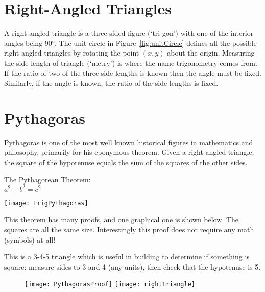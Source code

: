 \section{Right-Angled Triangles}
A right angled triangle is a three-sided figure (`tri-gon') with one of the interior angles being \ang{90}. The unit circle in Figure~\ref{fig:unitCircle} defines all the possible right angled triangles by rotating the point $(x,y)$ about the origin. Measuring the side-length of triangle (`metry') is where the name trigonometry comes from. If the ratio of two of the three side lengths is known then the angle must be fixed. Similarly, if the angle is known, the ratio of the side-lengths is fixed.

\section*{Pythagoras}\label{sec:pythagoras}
Pythagoras is one of the most well known historical figures in mathematics and philosophy, primarily for his eponymous theorem. Given a right-angled triangle, the square of the hypotenuse equals the sum of the squares of the other sides.
\begin{tcolorbox}[colback=white]
	\begin{multicols}{2}
		\begin{center}
			The Pythagorean Theorem:\\
			\vspace{1cm}$a^2+b^2=c^2$
		\end{center}
		\columnbreak
		\begin{center}
			\texttt{[image: trigPythagoras]}
		\end{center}
	\end{multicols}
\end{tcolorbox}

This theorem has many proofs, and one graphical one is shown below. The squares are all the same size. Interestingly this proof does not require any math (symbols) at all!

This is a 3-4-5 triangle which is useful in building to determine if something is square: measure sides to 3 and 4 (any units), then check that the hypotenuse is 5.

\begin{figure}
\begin{center}
	\texttt{[image: PythagorasProof]}
\hspace{1cm}
	\texttt{[image: rightTriangle]}
\end{center}
\end{figure}
